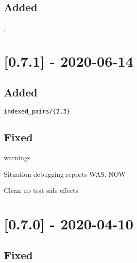 \subsection{Added}

\begin{shortlist}
    \item {}
    \item {}
    \item {}
    \item {}, 
\end{shortlist}

\section{[0.7.1] - 2020-06-14}

\subsection{Added}

\begin{shortlist}
    \item \verb$indexed_pairs/{2,3}$
    \item {}
    \item {}
    \item {}
\end{shortlist}

\subsection{Fixed}

\begin{shortlist}
    \item {} warnings
    \item Situation debugging reports WAS, NOW
    \item Clean up test side effects
\end{shortlist}

\section{[0.7.0] - 2020-04-10}

\subsection{Fixed}

